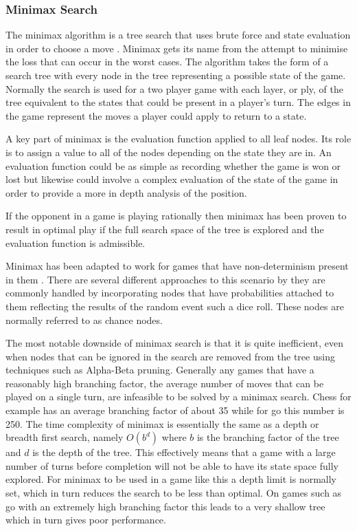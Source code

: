 \documentclass[]{article}
\begin{document}
\subsubsection{Minimax Search}
The minimax algorithm is a tree search that uses brute force and state evaluation in order to choose a move \autocite[122]{russell1995modern}. Minimax gets its name from the attempt to minimise the loss that can occur in the worst cases. The algorithm takes the form of a search tree with every node in the tree representing a possible state of the game. Normally the search is used for a two player game with each layer, or ply, of the tree equivalent to the states that could be present in a player's turn. The edges in the game represent the moves a player could apply to return to a state.

\par A key part of minimax is the evaluation function applied to all leaf nodes. Its role is to assign a value to all of the nodes depending on the state they are in. An evaluation function could be as simple as recording whether the game is won or lost but likewise could involve a complex evaluation of the state of the game in order to provide a more in depth analysis of the position.

\par If the opponent in a game is playing rationally then minimax has been proven to result in optimal play if the full search space of the tree is explored and the evaluation function is admissible.

\par Minimax has been adapted to work for games that have non-determinism present in them \autocite[133]{russell1995modern}. There are several different approaches to this scenario by they are commonly handled by incorporating nodes that have probabilities attached to them reflecting the results of the random event such a dice roll. These nodes are normally referred to as chance nodes.

\par The most notable downside of minimax search is that it is quite inefficient, even when nodes that can be ignored in the search are removed from the tree using techniques such as Alpha-Beta pruning. Generally any games that have a reasonably high branching factor, the average number of moves that can be played on a single turn, are infeasible to be solved by a minimax search. Chess for example has an average branching factor of about 35 while for go this number is 250. The time complexity of minimax is essentially the same as a depth or breadth first search, namely $O(b^d)$ where $b$ is the branching factor of the tree and $d$ is the depth of the tree. This effectively means that a game with a large number of turns before completion will not be able to have its state space fully explored. For minimax to be used in a game like this a depth limit is normally set, which in turn reduces the search to be less than optimal. On games such as go with an extremely high branching factor this leads to a very shallow tree which in turn gives poor performance.
\end{document}
